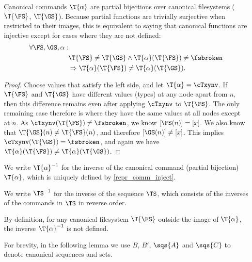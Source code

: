 \begin{mylem}
Canonical commands $\T{\alpha}$ are partial bijections over canonical filesystems
($\T{\FS}$, $\T{\GS}$).
Because partial functions are trivially surjective when restricted to their images, this is
equivalent to saying that canonical functions are injective except for cases
where they are not defined:
\begin{align*}
\forall\FS,\GS,\alpha:& \\
& \T{\FS}\neq\T{\GS} \wedge \T{\alpha}(\T{\FS})\neq\fsbroken \\
& \Rightarrow \T{\alpha}(\T{\FS}) \neq \T{\alpha}(\T{\GS}).
\end{align*}
\end{mylem}
\begin{proof}
Choose values that satisfy the left side, and let $\T{\alpha} = \cTxynv$.
If $\T{\FS}$ and $\T{\GS}$ have different values (types) at any node apart from $n$, then this difference remains
even after applying $\cTxynv$ to $\T{\FS}$. 
The only remaining case therefore is where they have the same values
at all nodes except at $n$.
As $\cTxynv(\T{\FS})\neq\fsbroken$, we know $[\FS(n)]=[x]$.
We also know that $\T{\GS}(n)\neq\T{\FS}(n)$, and therefore
$[\GS(n)]\neq[x]$.
This implies $\cTxynv(\T{\GS})=\fsbroken$,
and again we have $\T{\alpha}(\T{\FS}) \neq \T{\alpha}(\T{\GS})$.
\end{proof}


\begin{mydef}
We write $\T{\alpha}^{-1}$ for
the inverse of the canonical command (partial bijection) $\T{\alpha}$,
which is uniquely defined by \cref{repr_comm_inject}.

We write $\TS^{-1}$ for the inverse of the sequence $\TS$, which consists of the inverses of the commands in $\TS$ in reverse order.
\end{mydef}
By definition, for any canonical filesystem $\T{\FS}$ outside the image of 
$\T{\alpha}$, the inverse $\T{\alpha}^{-1}$ is not defined.




For brevity, in the following lemma we use $B$, $B'$, $\sqs{A}$ and $\sqs{C}$ to denote
canonical sequences and sets.


